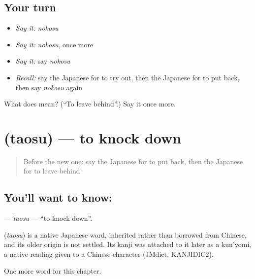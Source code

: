 \subsection*{Your turn}
\begin{itemize}
\raggedright
  \item \emph{Say it:} \emph{nokosu}
  \item \emph{Say it:} \emph{nokosu}, once more
  \item \emph{Say it:} say \emph{nokosu}
  \item \emph{Recall:} say the Japanese for to try out, then the Japanese for to put back, then say \emph{nokosu} again
\end{itemize}

\begin{tcolorbox}[breakable,colback=teal!4,colframe=teal!35!black,title={Before you move on}]
What does  mean? (\textquotedblleft{}To leave behind\textquotedblright{}.) Say it once more.
\end{tcolorbox}
\section[\texorpdfstring{\ja{たおす} (taosu)}{たおす (taosu)}]{ (taosu) — to knock down}

\label{lesson:JA-C88-taosu}



\begin{quote}
Before the new one: say the Japanese for to put back, then the Japanese for to leave behind.
\end{quote}

\subsection*{You'll want to know: }
\textbf{} — \emph{taosu} — \textquotedblleft{}to knock down\textquotedblright{}.

\begin{cousinweb}
\textbf{} (\emph{taosu}) is a native Japanese word, inherited rather than borrowed from Chinese, and its older origin is not settled. Its kanji was attached to it later as a kun'yomi, a native reading given to a Chinese character (JMdict, KANJIDIC2).
\end{cousinweb}

\begin{grammarlens}[title={What you've built}]
One more word for this chapter.
\end{grammarlens}


